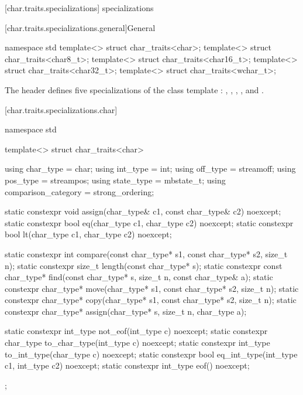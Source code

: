 [char.traits.specializations]{ specializations}

[char.traits.specializations.general]{General}

%
\begin{codeblock}
namespace std {
  template<> struct char_traits<char>;
  template<> struct char_traits<char8_t>;
  template<> struct char_traits<char16_t>;
  template<> struct char_traits<char32_t>;
  template<> struct char_traits<wchar_t>;
}
\end{codeblock}

\pnum
The header 
defines five specializations of the class template
:
,
,
,
,
and
.


[char.traits.specializations.char]{}

%
\begin{codeblock}
namespace std {
  template<> struct char_traits<char> {
    using char_type  = char;
    using int_type   = int;
    using off_type   = streamoff;
    using pos_type   = streampos;
    using state_type = mbstate_t;
    using comparison_category = strong_ordering;

    static constexpr void assign(char_type& c1, const char_type& c2) noexcept;
    static constexpr bool eq(char_type c1, char_type c2) noexcept;
    static constexpr bool lt(char_type c1, char_type c2) noexcept;

    static constexpr int compare(const char_type* s1, const char_type* s2, size_t n);
    static constexpr size_t length(const char_type* s);
    static constexpr const char_type* find(const char_type* s, size_t n,
                                           const char_type& a);
    static constexpr char_type* move(char_type* s1, const char_type* s2, size_t n);
    static constexpr char_type* copy(char_type* s1, const char_type* s2, size_t n);
    static constexpr char_type* assign(char_type* s, size_t n, char_type a);

    static constexpr int_type not_eof(int_type c) noexcept;
    static constexpr char_type to_char_type(int_type c) noexcept;
    static constexpr int_type to_int_type(char_type c) noexcept;
    static constexpr bool eq_int_type(int_type c1, int_type c2) noexcept;
    static constexpr int_type eof() noexcept;
  };
}
\end{codeblock}

